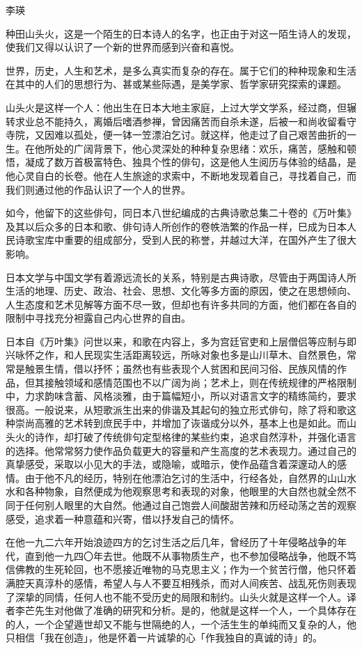 {\FS \hfill 李瑛

    种田山头火，这是一个陌生的日本诗人的名字，也正由于对这一陌生诗人的发现，使我们又得以认识了一个新的世界而感到兴奋和喜悦。

    世界，历史，人生和艺术，是多么真实而复杂的存在。属于它们的种种现象和生活在其中的人们的思想行为、甚或某些际遇，是美学家、哲学家研究探索的课题。

    山头火是这样一个人：他出生在日本大地主家庭，上过大学文学系，经过商，但辗转求业总不能持久，离婚后嗜酒参禅，曾因痛苦而自杀未遂，后被一和尚收留看守寺院，又因难以孤处，便一钵一笠漂泊乞讨。就这样，他走过了自己艰苦曲折的一生。在他所处的广阔背景下，他心灵深处的种种复杂思绪：欢乐，痛苦，感触和顿悟，凝成了数万首极富特色、独具个性的俳句，这是他人生阅历与体验的结晶，是他心灵自白的长卷。他在人生旅途的求索中，不断地发现着自己，寻找着自己，而我们则通过他的作品认识了一个人的世界。

    如今，他留下的这些俳句，同日本八世纪编成的古典诗歌总集二十卷的《万叶集》及其以后众多的日本和歌、俳句诗人所创作的卷帙浩繁的作品一样，巳成为日本人民诗歌宝库中重要的组成部分，受到人民的称誉，并越过大洋，在国外产生了很大影响。

    日本文学与中国文学有着源远流长的关系，特别是古典诗歌，尽管由于两国诗人所生活的地理、历史、政治、社会、思想、文化等多方面的原因，使之在思想倾向、人生态度和艺术见解等方面不尽一致，但却也有许多共同的方面，他们都在各自的限制中寻找充分袒露自己内心世界的自由。

    日本自《万叶集》问世以来，和歌在内容上，多为宫廷官吏和上层僧侣等应制与即兴咏怀之作，和人民现实生活距离较远，所咏对象也多是山川草木、自然景色，常常是触景生情，借以抒怀；虽然也有些表现个人贫困和民间习俗、民族风情的作品，但其接触领域和感情范围也不以广阔为尚；艺术上，则在传统规律的严格限制中，力求韵味含蓄、风格淡雅，由于篇幅短小，所以对语言文字的精练简约，要求很高。一般说来，从短歌派生出来的俳谐及其起句的独立形式俳句，除了将和歌这种崇尚高雅的艺术转到庶民手中，并增加了诙谐成分以外，基本上也是如此。而山头火的诗作，却打破了传统俳句定型格律的某些约束，追求自然淳朴，并强化语言的选择。他常常努力使作品负载更大的容量和产生高度的艺术表现力。通过自己的真挚感受，采取以小见大的手法，或隐喻，或暗示，使作品蕴含着深邃动人的感情。由于他不凡的经历，特别在他漂泊乞讨的生活中，行经各处，自然界的山山水水和各种物象，自然便成为他观察思考和表现的对象，他眼里的大自然也就全然不同于任何别人眼里的大自然。他通过自己饱尝人间酸甜苦辣和历经动荡之苦的观察感受，追求着一种意蕴和兴寄，借以抒发自己的情怀。

    在他一九二六年开始浪迹四方的乞讨生活之后几年，曾经历了十年侵略战争的年代，直到他一九四〇年去世。他既不从事物质生产，也不参加侵略战争，他既不笃信佛教的生死轮回，也不愿接近唯物的马克思主义；作为一个贫苦行僧，他只怀着满腔天真淳朴的感情，希望人与人不要互相残杀，而对人间疾苦、战乱死伤则表现了深挚的同情，任何人也不能不受历史的局限和制约。山头火就是这样一个人。译者李芒先生对他做了准确的研究和分析。是的，他就是这样一个人，一个具体存在的人，一个企望遁世却又不能与世隔绝的人，一个活生生的单纯而又复杂的人，他只相信「我在创造」，他是怀着一片诚挚的心「作我独自的真诚的诗」的。

}
